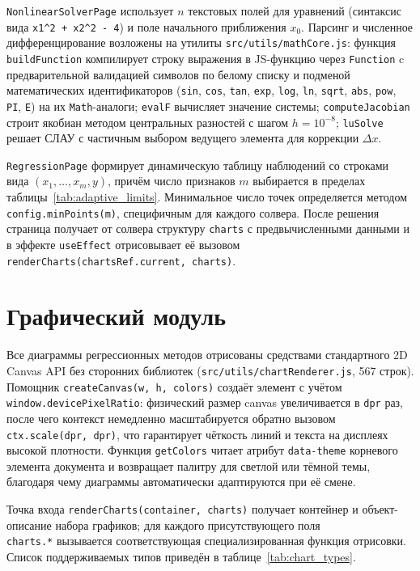 \documentclass[12pt, oneside]{book}
\begin{document}
    \quad \texttt{NonlinearSolverPage} использует $n$ текстовых полей для уравнений (синтаксис вида \texttt{x1\^{}2 + x2\^{}2 - 4}) и поле начального приближения $x_0$. Парсинг и численное дифференцирование возложены на утилиты \texttt{src/utils/mathCore.js}: функция \texttt{buildFunction} компилирует строку выражения в JS-функцию через \texttt{Function} c предварительной валидацией символов по белому списку и подменой математических идентификаторов (\texttt{sin}, \texttt{cos}, \texttt{tan}, \texttt{exp}, \texttt{log}, \texttt{ln}, \texttt{sqrt}, \texttt{abs}, \texttt{pow}, \texttt{PI}, \texttt{E}) на их \texttt{Math}-аналоги; \texttt{evalF} вычисляет значение системы; \texttt{computeJacobian} строит якобиан методом центральных разностей с шагом $h = 10^{-8}$; \texttt{luSolve} решает СЛАУ с частичным выбором ведущего элемента для коррекции $\Delta x$.

    \quad \texttt{RegressionPage} формирует динамическую таблицу наблюдений со строками вида $(x_1, \ldots, x_m, y)$, причём число признаков $m$ выбирается в пределах таблицы~\ref{tab:adaptive_limits}. Минимальное число точек определяется методом \texttt{config.minPoints(m)}, специфичным для каждого солвера. После решения страница получает от солвера структуру \texttt{charts} с предвычисленными данными и в эффекте \texttt{useEffect} отрисовывает её вызовом \texttt{renderCharts(chartsRef.current, charts)}.

\section{Графический модуль}

    \quad Все диаграммы регрессионных методов отрисованы средствами стандартного 2D Canvas API без сторонних библиотек (\texttt{src/utils/chartRenderer.js}, 567 строк). Помощник \texttt{createCanvas(w, h, colors)} создаёт элемент с учётом \texttt{window.devicePixelRatio}: физический размер canvas увеличивается в \texttt{dpr} раз, после чего контекст немедленно масштабируется обратно вызовом\\ \texttt{ctx.scale(dpr, dpr)}, что гарантирует чёткость линий и текста на дисплеях высокой плотности. Функция \texttt{getColors} читает атрибут \texttt{data-theme} корневого элемента документа и возвращает палитру для светлой или тёмной темы, благодаря чему диаграммы автоматически адаптируются при её смене.

    \quad Точка входа \texttt{renderCharts(container, charts)} получает контейнер и объект-описание набора графиков; для каждого присутствующего поля\\ \texttt{charts.*} вызывается соответствующая специализированная функция отрисовки. Список поддерживаемых типов приведён в таблице~\ref{tab:chart_types}.
\end{document}
